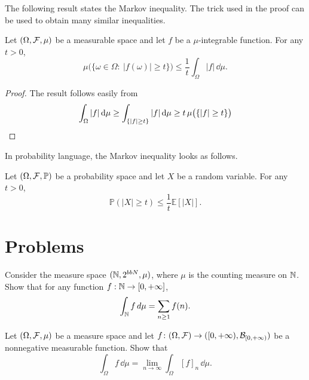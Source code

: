 The following result states the Markov inequality. The trick used in the proof can be used to obtain many similar inequalities.

\begin{lemma}
	Let $(\Omega, \mathcal F, \mu)$ be a measurable space and let $f$ be a $\mu$-integrable function. For any $t>0$,
	\[
	\mu\bigl(\{ \omega \in \Omega : \ |f(\omega)| \geq t \}\bigr) \leq \frac{1}{t} \int_\Omega |f| \,\dd \mu.
	\]
\end{lemma}
\begin{proof} The result follows easily from
	\[
		\int_\Omega |f|\,\mathrm{d} \mu \ge \int_{\{|f|\ge t\}} |f|\,\mathrm{d} \mu \ge t\,\mu\bigl(\{|f|\ge t\}\bigr)  \qedhere
	\]
\end{proof}


In probability language, the Markov inequality looks as follows.

\begin{lemma}
	Let $(\Omega, \mathcal F, \mathbb{P})$ be a probability space and let $X$ be a random variable. For any $t>0$,
	\[
	\mathbb{P}(|X| \geq t) \leq \frac{1}{t} \mathbb{E}[|X|].
	\]
\end{lemma}


\section{Problems}

\begin{problem}
	Consider the measure space $(\mathbb N,2^{bbN},\mu)$, where $\mu$ is the counting measure on $\mathbb N$. Show that for any function $f:\mathbb N\to[0,+\infty]$,
	\[
		\int_{\mathbb N} f\,d\mu = \sum_{n\ge 1} f(n).
	\]
\end{problem}

\begin{problem}
	\label{prb:simple-approx-integral}
 Let $(\Omega, \mathcal F, \mu)$ be a measure space and let $f\colon (\Omega,\mathcal F) \to ([0,+\infty), \mathcal B_{[0,+\infty)})$ be a nonnegative measurable function. Show that
\[
\int_\Omega f\, \dd \mu = \lim_{n \to \infty} \int_\Omega [f]_n\, \dd \mu.
\]	
\end{problem}

